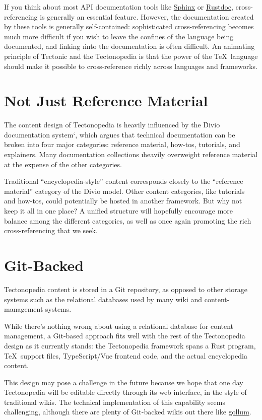 If you think about most API documentation tools like
\href{https://www.sphinx-doc.org/}{Sphinx} or
\href{https://doc.rust-lang.org/rustdoc/}{Rustdoc}, cross-referencing is
generally an essential feature. However, the documentation created by these
tools is generally self-contained: sophisticated cross-referencing becomes much
more difficult if you wish to leave the confines of the language being
documented, and linking \i{into} the documentation is often difficult. An
animating principle of Tectonic and the Tectonopedia is that the power of the
\TeX\ language should make it possible to cross-reference richly across
languages and frameworks.

\section*{Not Just Reference Material}

The content design of Tectonopedia is heavily influenced by the \`Divio
documentation system`, which argues that technical documentation can be broken
into four major categories: reference material, how-tos, tutorials, and
explainers. Many documentation collections \i{heavily} overweight reference
material at the expense of the other categories.

Traditional “encyclopedia-style” content corresponds closely to the “reference
material” category of the Divio model. Other content categories, like tutorials
and how-tos, could potentially be hosted in another framework. But why not keep
it all in one place? A unified structure will hopefully encourage more balance
among the different categories, as well as once again promoting the rich
cross-referencing that we seek.

\section*{Git-Backed}

Tectonopedia content is stored in a Git repository, as opposed to other storage
systems such as the relational databases used by many wiki and
content-management systems.

While there's nothing wrong about using a relational database for content
management, a Git-based approach fits well with the rest of the Tectonopedia
design as it currently stands: the Tectonopedia framework spans a Rust program,
\TeX\ support files, TypeScript/Vue frontend code, and the actual encyclopedia
content.

This design may pose a challenge in the future because we hope that one day
Tectonopedia will be editable directly through its web interface, in the style
of traditional wikis. The technical implementation of this capability seems
challenging, although there are plenty of Git-backed wikis out there like
\href{https://github.com/gollum/gollum}{gollum}.

